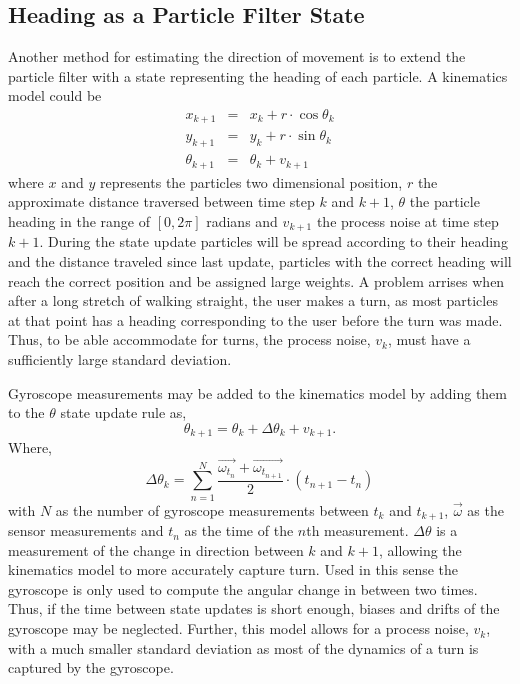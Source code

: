 \documentclass{LTHthesis}
\begin{document}
\subsection{Heading as a Particle Filter State}
\label{subsec:PF_heading}
%
Another method for estimating the direction of movement is to extend the particle filter with a state representing the heading of each particle. A kinematics model could be
%
\begin{eqnarray}
x_{k+1} &  = & x_k + r\cdot\cos{\theta_k} \nonumber\\
y_{k+1} & = &y_k + r\cdot\sin{\theta_k}\label{eq:heading_kin_mod}\\
\theta_{k+1} & = & \theta_k + v_{k+1} \nonumber
\end{eqnarray}
%
where $x$ and $y$ represents the particles two dimensional position, $r$ the approximate distance traversed between time step $k$ and $k+1$, $\theta$ the particle heading in the range of $\left[0,2\pi\right]$ radians and $v_{k+1}$ the process noise at time step $k+1$. During the state update particles will be spread according to their heading and the distance traveled since last update, particles with the correct heading will reach the correct position and be assigned large weights. A problem arrises when after a long stretch of walking straight, the user makes a turn, as most particles at that point has a heading corresponding to the user before the turn was made. Thus, to be able accommodate for turns, the process noise, $v_k$, must have a sufficiently large standard deviation. 

Gyroscope measurements may be added to the kinematics model by adding them to the $\theta$ state update rule as,
%
\begin{equation}
\theta_{k+1} = \theta_k + \Delta\theta_k + v_{k+1}.\label{eq:heading_gyro}
\end{equation} 
%
Where,
%
\begin{equation}
\Delta\theta_k = \sum^N_{n=1}\frac{\vec{\omega_{t_n}}+\vec{\omega_{t_{n+1}}}}{2}\cdot\left(t_{n+1}-t_n\right)
\end{equation}
%
with $N$ as the number of gyroscope measurements between $t_k$ and $t_{k+1}$, $\vec{\omega}$ as the sensor measurements and $t_n$ as the time of the $n$th measurement. $\Delta\theta$ is a measurement of the change in direction between $k$ and $k+1$, allowing the kinematics model to more accurately capture turn. Used in this sense the gyroscope is only used to compute the angular change in between two times. Thus, if the time between state updates is short enough, biases and drifts of the gyroscope may be neglected. Further, this model allows for a process noise, $v_k$, with a much smaller standard deviation as most of the dynamics of a turn is captured by the gyroscope. 
\end{document}

